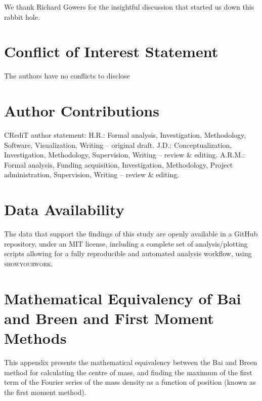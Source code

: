 \documentclass[reprint,superscriptaddress,nobibnotes,amsmath,amssymb,aip]{revtex4-2}
\begin{document}
\begin{acknowledgements}
We thank Richard Gowers for the insightful discussion that started us down this rabbit hole.
\end{acknowledgements}

\section*{Conflict of Interest Statement}

The authors have no conflicts to disclose

\section*{Author Contributions}
CRediT author statement: 
H.R.: Formal analysis, Investigation, Methodology, Software, Visualization, Writing – original draft.
J.D.: Conceptualization, Investigation, Methodology, Supervision, Writing – review \& editing.
A.R.M.: Formal analysis, Funding acquisition, Investigation, Methodology, Project administration, Supervision, Writing – review \& editing.

\section*{Data Availability}

The data that support the findings of this study are openly available in a GitHub repository\cite{richardson_github_2025}, under an MIT license, including a complete set of analysis/plotting scripts allowing for a fully reproducible and automated analysis workflow, using \textsc{showyourwork}\cite{luger_showyourwork_2021}.

\appendix

\section{Mathematical Equivalency of Bai and Breen and First Moment Methods}
\label{app:math}

This appendix presents the mathematical equivalency between the Bai and Breen method for calculating the centre of mass, and finding the maximum of the first term of the Fourier series of the mass density as a function of position (known as the first moment method\cite{teague_robust_2018}).
\end{document}
